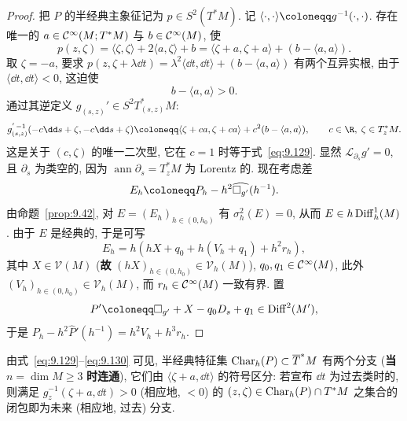\begin{proof}
把 $P$ 的半经典主象征记为 $p \in S^2(T^* M)$. 记 $\langle \cdot, \cdot \rangle \defeq g^{-1}(\cdot, \cdot)$. 存在唯一的 $a \in \mathcal{C}^\infty(M; T^* M)$ 与 $b \in \mathcal{C}^\infty(M)$, 使
\begin{equation}\label{eq:9.129}
    p(z, \zeta) = \langle \zeta, \zeta \rangle + 2 \langle a, \zeta \rangle + b = \langle \zeta + a, \zeta + a \rangle + (b - \langle a, a \rangle).
\end{equation}
取 $\zeta = -a$, 要求 $p(z, \zeta + \lambda \dd t) = \lambda^2 \langle \dd t, \dd t \rangle + (b - \langle a, a \rangle)$ 有两个互异实根, 由于 $\langle \dd t, \dd t \rangle < 0$, 这迫使
\begin{equation}\label{eq:9.130}
    b - \langle a, a \rangle > 0.
\end{equation}
通过其逆定义 $g_{(s,z)}' \in S^2 T_{(s,z)}^* M$:
\begin{equation}\label{eq:9.131}
    g_{(s,z)}^{'\,-1}(-c \dd s + \zeta, -c \dd s + \zeta) \defeq \langle \zeta + ca, \zeta + ca \rangle + c^2 (b - \langle a, a \rangle), \qquad c \in \R, \; \zeta \in T_z^* M.
\end{equation}
这是关于 $(c, \zeta)$ 的唯一二次型, 它在 $c = 1$ 时等于式~\eqref{eq:9.129}. 显然 $\mathcal{L}_{\partial_s} g' = 0$, 且 $\partial_s$ 为类空的, 因为 $\operatorname{ann} \partial_s = T_z^* M$ 为 Lorentz 的. 现在考虑差
\begin{equation}\label{eq:9.132}
    E_h \defeq P_h - h^2 \widehat{\Box_{g'}}(h^{-1}).
\end{equation}
由命题~\ref{prop:9.42}, 对 $E = (E_h)_{h \in (0, h_0)}$ 有 $\sigma_h^2(E) = 0$, 从而 $E \in h \operatorname{Diff}_h^1(M)$. 由于 $E$ 是经典的, 于是可写
\begin{equation}\label{eq:9.133}
    E_h = h \left( hX + q_0 + h(V_h + q_1) + h^2 r_h \right),
\end{equation}
其中 $X \in \mathcal{V}(M)$ (\textbf{故} $(hX)_{h \in (0, h_0)} \in \mathcal{V}_h(M)$), $q_0, q_1 \in \mathcal{C}^\infty(M)$, 此外 $(V_h)_{h \in (0, h_0)} \in \mathcal{V}_h(M)$, 而 $r_h \in \mathcal{C}^\infty(M)$ 一致有界. 置
\begin{equation}\label{eq:9.134}
    P' \defeq \Box_{g'} + X - q_0 D_s + q_1 \in \Diff^2(M'),
\end{equation}
于是 $P_h - h^2 \widehat{P}'(h^{-1}) = h^2 V_h + h^3 r_h$.
\end{proof}

由式~\eqref{eq:9.129}--\eqref{eq:9.130} 可见, 半经典特征集 $\operatorname{Char}_h(P) \subset \overline{T}^* M$ 有两个分支 (\textbf{当} $n = \dim M \ge 3$ \textbf{时连通}), 它们由 $\langle \zeta + a, \dd t \rangle$ 的符号区分: 若宣布 $\dd t$ 为过去类时的, 则满足 $g_z^{-1}(\zeta + a, \dd t) > 0$ (相应地, $< 0$) 的 $(z, \zeta) \in \operatorname{Char}_h(P) \cap T^* M$ 之集合的闭包即为未来 (相应地, 过去) 分支.

